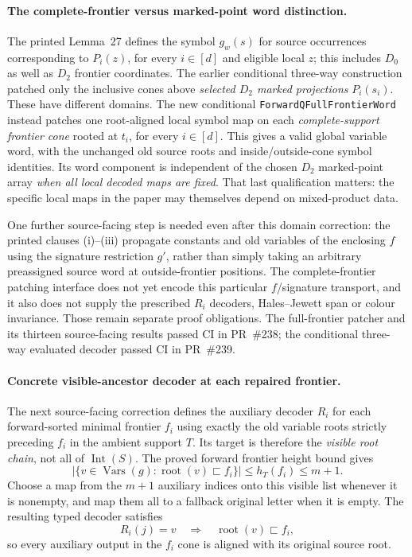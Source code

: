 \documentclass[11pt]{article}
\begin{document}
\paragraph{The complete-frontier versus marked-point word distinction.}
The printed Lemma~27 defines the symbol
\(g_w(s)\) for source occurrences corresponding to
\(P_i(z)\), for every \(i\in[d]\) and
eligible local \(z\); this includes \(D_0\)
as well as \(D_2\) frontier coordinates.
The earlier conditional three-way construction
patched only the inclusive cones above
\emph{selected \(D_2\) marked projections}
\(P_i(s_i)\). These have different domains.
The new conditional
\texttt{ForwardQFullFrontierWord} instead
patches one root-aligned local symbol map
on each \emph{complete-support frontier cone}
rooted at \(t_i\), for every \(i\in[d]\).
This gives a valid global variable word,
with the unchanged old source roots and
inside/outside-cone symbol identities.
Its word component is independent of
the chosen \(D_2\) marked-point array
\emph{when all local decoded maps are fixed}.
That last qualification matters: the specific
local maps in the paper may themselves
depend on mixed-product data.

One further source-facing step is needed even
after this domain correction: the printed
clauses (i)--(iii) propagate constants and
old variables of the enclosing \(f\) using
the signature restriction \(g'\), rather than
simply taking an arbitrary preassigned
source word at outside-frontier positions.
The complete-frontier patching interface
does not yet encode this particular
\(f\)/signature transport, and it also
does not supply the prescribed \(R_i\)
decoders, Hales--Jewett span or colour
invariance. Those remain separate proof
obligations. The full-frontier patcher and its thirteen
source-facing results passed CI in PR~\#238;
the conditional three-way evaluated decoder passed CI
in PR~\#239.


\paragraph{Concrete visible-ancestor decoder at each repaired frontier.}
The next source-facing correction defines the auxiliary decoder
\(R_i\) for each forward-sorted minimal frontier \(f_i\)
using exactly the old variable roots strictly preceding \(f_i\)
in the ambient support \(T\). Its target is therefore the
\emph{visible root chain}, not all of \(\operatorname{Int}(S)\).
The proved forward frontier height bound gives
\[
 \bigl|\{v\in\operatorname{Vars}(g):
          \operatorname{root}(v)\sqsubset f_i\}\bigr|
 \le h_T(f_i)\le m+1.
\]
Choose a map from the \(m+1\) auxiliary indices
onto this visible list whenever it is nonempty,
and map them all to a fallback original letter
when it is empty. The resulting typed decoder
satisfies
\[
 R_i(j)=v\quad\Longrightarrow\quad
 \operatorname{root}(v)\sqsubset f_i,
\]
so every auxiliary output in the \(f_i\) cone
is aligned with its original source root.
\end{document}
